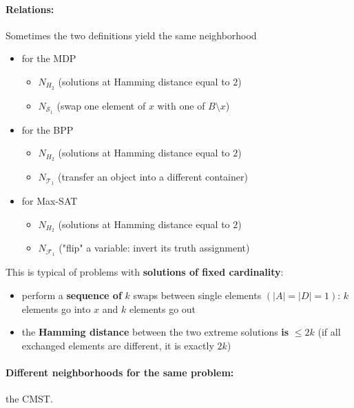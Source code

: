 \newpage

\paragraph{Relations:} Sometimes the two definitions yield the same neighborhood
\begin{itemize}
	\item for the MDP
	\begin{itemize}
		\item $N_{H_2}$ (solutions at Hamming distance equal to $2$)
		\item $N_{\mathcal{S}_1}$ (swap one element of $x$ with one of $B \setminus x$)
	\end{itemize}
	\nn
	
	\item for the BPP
	\begin{itemize}
		\item $N_{H_2}$ (solutions at Hamming distance equal to $2$)
		\item $N_{\mathcal{T}_1}$ (transfer an object into a different container)
	\end{itemize}
	\nn
	
	\item for Max-SAT
	\begin{itemize}
		\item $N_{H_2}$ (solutions at Hamming distance equal to $2$)
		\item $N_{\mathcal{F}_1}$ ("flip" a variable: invert its truth assignment)
	\end{itemize}
	\nn
\end{itemize}

This is typical of problems with \textbf{solutions of fixed cardinality}:
\begin{itemize}
	\item perform a \textbf{sequence of} $k$ swaps between single elements $(|A| = |D| = 1)$: $k$ elements go into $x$ and $k$ elements go out
	
	\nn
	
	\item the \textbf{Hamming distance} between the two extreme solutions \textbf{is} $\leq 2k$ (if all exchanged elements are different, it is exactly $2k$)
\end{itemize}

\newpage

\paragraph{Different neighborhoods for the same problem:} the CMST.\\

